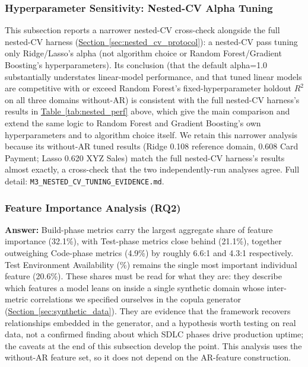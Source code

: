 \documentclass[technologies,article,submit,pdftex,moreauthors]{Definitions/mdpi}
\begin{document}
\subsubsection{Hyperparameter Sensitivity: Nested-CV Alpha Tuning}\label{sec:m3_tuning}

This subsection reports a narrower nested-CV cross-check alongside the full nested-CV harness (\hyperref[sec:nested_cv_protocol]{Section~\ref*{sec:nested_cv_protocol}}): a nested-CV pass tuning only Ridge/Lasso's alpha (not algorithm choice or Random Forest/Gradient Boosting's hyperparameters). Its conclusion (that the default alpha=1.0 substantially understates linear-model performance, and that tuned linear models are competitive with or exceed Random Forest's fixed-hyperparameter holdout \(R^2\) on all three domains without-AR) is consistent with the full nested-CV harness's results in \hyperref[tab:nested_perf]{Table~\ref*{tab:nested_perf}} above, which give the main comparison and extend the same logic to Random Forest and Gradient Boosting's own hyperparameters and to algorithm choice itself. We retain this narrower analysis because its without-AR tuned results (Ridge 0.108 reference domain, 0.608 Card Payment; Lasso 0.620 XYZ Sales) match the full nested-CV harness's results almost exactly, a cross-check that the two independently-run analyses agree. Full detail: \texttt{M3\_NESTED\_CV\_TUNING\_EVIDENCE.md}.

\subsubsection{Feature Importance Analysis (RQ2)}\label{sec:feature_importance}

\textbf{Answer:} Build-phase metrics carry the largest aggregate share of feature importance (32.1\%), with Test-phase metrics close behind (21.1\%), together outweighing Code-phase metrics (4.9\%) by roughly 6.6:1 and 4.3:1 respectively. Test Environment Availability (\%) remains the single most important individual feature (20.6\%). These shares must be read for what they are: they describe which features a model leans on inside a single synthetic domain whose inter-metric correlations we specified ourselves in the copula generator (\hyperref[sec:synthetic_data]{Section~\ref*{sec:synthetic_data}}). They are evidence that the framework recovers relationships embedded in the generator, and a hypothesis worth testing on real data, not a confirmed finding about which SDLC phases drive production uptime; the caveats at the end of this subsection develop the point. This analysis uses the without-AR feature set, so it does not depend on the AR-feature construction.
\end{document}
